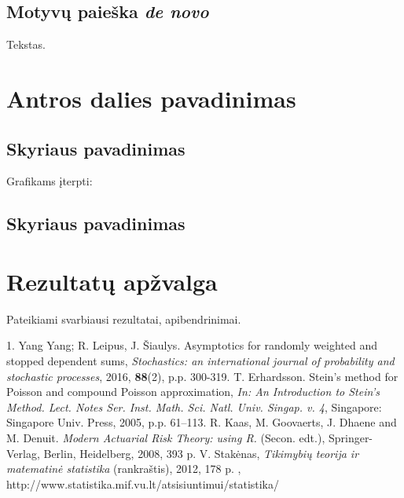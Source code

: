 \documentclass[11pt]{article}
\begin{document}
\subsection{Motyvų paieška \emph{de novo}}
Tekstas.



\newpage

\section{Antros dalies pavadinimas}
\subsection{Skyriaus pavadinimas}
Grafikams įterpti:
\begin{figure}[h]

\end{figure}


\subsection{Skyriaus pavadinimas}

\newpage


\section{Rezultatų apžvalga}
Pateikiami svarbiausi rezultatai, apibendrinimai.

\newpage



\begin{thebibliography}{99}

1. Yang Yang; R. Leipus, J. \v{S}iaulys. Asymptotics for randomly weighted and stopped dependent sums, \emph{Stochastics: an international journal of probability and stochastic processes}, 2016, \textbf{88}(2), p.p. 300-319.
  T. Erhardsson. Stein’s method for Poisson and compound Poisson approximation, \emph{In: An Introduction to Stein’s Method. Lect. Notes Ser. Inst. Math. Sci. Natl. Univ. Singap. v. 4}, Singapore: Singapore Univ. Press, 2005, p.p. 61–113.
 R. Kaas, M. Goovaerts, J. Dhaene  and M. Denuit. \emph{Modern Actuarial Risk Theory:
using R.} (Secon. edt.), Springer-Verlag, Berlin, Heidelberg,  2008, 393 p.
 V. Stakėnas, \emph{Tikimybių teorija ir matematinė statistika} (rankraštis), 2012, 178 p. , http://www.statistika.mif.vu.lt/atsisiuntimui/statistika/

\end{thebibliography}
\newpage
\end{document}
